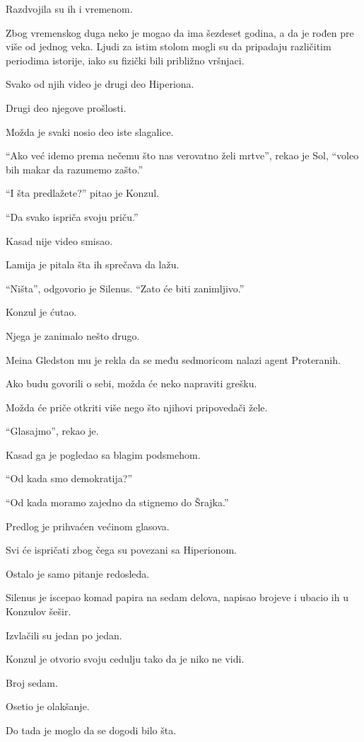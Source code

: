 Razdvojila su ih i vremenom.

Zbog vremenskog duga neko je mogao da ima šezdeset godina, a da je rođen pre više od jednog veka. Ljudi za istim stolom mogli su da pripadaju različitim periodima istorije, iako su fizički bili približno vršnjaci.

Svako od njih video je drugi deo Hiperiona.

Drugi deo njegove prošlosti.

Možda je svaki nosio deo iste slagalice.

``Ako već idemo prema nečemu što nas verovatno želi mrtve'', rekao je Sol, ``voleo bih makar da razumemo zašto.''

``I šta predlažete?'' pitao je Konzul.

``Da svako ispriča svoju priču.''

Kasad nije video smisao.

Lamija je pitala šta ih sprečava da lažu.

``Ništa'', odgovorio je Silenus. ``Zato će biti zanimljivo.''

Konzul je ćutao.

Njega je zanimalo nešto drugo.

Meina Gledston mu je rekla da se među sedmoricom nalazi agent Proteranih.

Ako budu govorili o sebi, možda će neko napraviti grešku.

Možda će priče otkriti više nego što njihovi pripovedači žele.

``Glasajmo'', rekao je.

Kasad ga je pogledao sa blagim podsmehom.

``Od kada smo demokratija?''

``Od kada moramo zajedno da stignemo do Šrajka.''

Predlog je prihvaćen većinom glasova.

Svi će ispričati zbog čega su povezani sa Hiperionom.

Ostalo je samo pitanje redosleda.

Silenus je iscepao komad papira na sedam delova, napisao brojeve i ubacio ih u Konzulov šešir.

Izvlačili su jedan po jedan.

Konzul je otvorio svoju cedulju tako da je niko ne vidi.

Broj sedam.

Osetio je olakšanje.

Do tada je moglo da se dogodi bilo šta.

